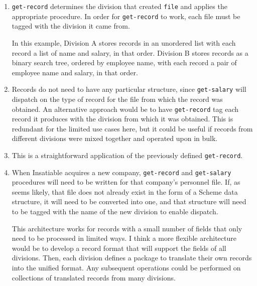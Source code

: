 \documentclass{article}
\begin{document}
\begin{enumerate}
    \item \texttt{get-record} determines the division that created \texttt{file}
        and applies the appropriate procedure. In order for \texttt{get-record}
        to work, each file must be tagged with the division it came from.

        

        In this example, Division A stores records in an unordered list with
        each record a list of name and salary, in that order. Division B stores
        records as a binary search tree, ordered by employee name, with each
        record a pair of employee name and salary, in that order.
    \item Records do not need to have any particular structure, since
        \texttt{get-salary} will dispatch on the type of record for the file
        from which the record was obtained. An alternative approach would be to
        have \texttt{get-record} tag each record it produces with the division
        from which it was obtained. This is redundant for the limited use cases
        here, but it could be useful if records from different divisions were
        mixed together and operated upon in bulk.

        
    \item This is a straightforward application of the previously defined
        \texttt{get-record}.

        
    \item When Insatiable acquires a new company, \texttt{get-record} and
        \texttt{get-salary} procedures will need to be written for that
        company's personnel file. If, as seems likely, that file does not
        already exist in the form of a Scheme data structure, it will need to
        be converted into one, and that structure will need to be tagged with
        the name of the new division to enable dispatch.

        This architecture works for records with a small number of fields that
        only need to be processed in limited ways. I think a more flexible
        architecture would be to develop a record format that will support the
        fields of all divisions. Then, each division defines a package to
        translate their own records into the unified format. Any subsequent
        operations could be performed on collections of translated records from
        many divisions.
\end{enumerate}
\end{document}
